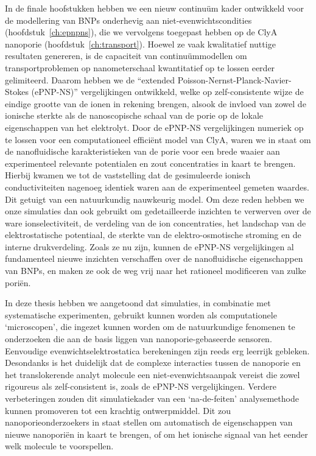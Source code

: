 In de finale hoofstukken hebben we een nieuw continu\"{u}m kader ontwikkeld voor de modellering van {BNPs}
onderhevig aan niet-evenwichtscondities (hoofdstuk~\ref{ch:epnpns}), die we vervolgens toegepast hebben op de
{ClyA} nanoporie (hoofdstuk~\ref{ch:transport}). Hoewel ze vaak kwalitatief nuttige resultaten genereren, is
de capaciteit van continu\"{u}mmodellen om transportproblemen op nanometerschaal kwantitatief op te lossen
eerder gelimiteerd. Daarom hebben we de ``extended Poisson-Nernst-Planck-Navier-Stokes ({ePNP-NS})''
vergelijkingen ontwikkeld, welke op zelf-consistente wijze de eindige grootte van de ionen in rekening
brengen, alsook de invloed van zowel de ionische sterkte als de nanoscopische schaal van de porie op de lokale
eigenschappen van het elektrolyt. Door de {ePNP-NS} vergelijkingen numeriek op te lossen voor een
computationeel effici\"{e}nt model van {ClyA}, waren we in staat om de nanofluidische karakteristieken van de
porie voor een brede waaier aan experimenteel relevante potentialen en zout concentraties in kaart te brengen.
Hierbij kwamen we tot de vaststelling dat de gesimuleerde ionisch conductiviteiten nagenoeg identiek waren aan
de experimenteel gemeten waardes. Dit getuigt van een natuurkundig nauwkeurig model. Om deze reden hebben we
onze simulaties dan ook gebruikt om gedetailleerde inzichten te verwerven over de ware ionselectiviteit, de
verdeling van de ion concentraties, het landschap van de elektrostatische potentiaal, de sterkte van de
elektro-osmotische stroming en de interne drukverdeling. Zoals ze nu zijn, kunnen de {ePNP-NS} vergelijkingen
al fundamenteel nieuwe inzichten verschaffen over de nanofluidische eigenschappen van BNPs, en maken ze ook
de weg vrij naar het rationeel modificeren van zulke pori\"{e}n.

In deze thesis hebben we aangetoond dat simulaties, in combinatie met systematische experimenten, gebruikt
kunnen worden als computationele `microscopen', die ingezet kunnen worden om de natuurkundige fenomenen te
onderzoeken die aan de basis liggen van nanoporie-gebaseerde sensoren. Eenvoudige evenwichtselektrostatica
berekeningen zijn reeds erg leerrijk gebleken. Desondanks is het duidelijk dat de complexe interacties tussen
de nanoporie en het translokerende analyt molecule een niet-evenwichtsaanpak vereist die zowel rigoureus als
zelf-consistent is, zoals de {ePNP-NS} vergelijkingen. Verdere verbeteringen zouden dit simulatiekader van een
`na-de-feiten' analysemethode kunnen promoveren tot een krachtig ontwerpmiddel. Dit zou nanoporieonderzoekers
in staat stellen om automatisch de eigenschappen van nieuwe nanopori\"{e}n in kaart te brengen, of om het
ionische signaal van het eender welk molecule te voorspellen.


\cleardoublepage

